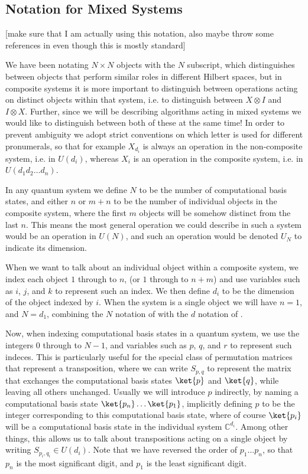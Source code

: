 \subsection{Notation for Mixed Systems}
[make sure that I am actually using this notation, also maybe throw some references in even though this is mostly standard]

We have been notating $N \times N$ objects with the $N$ subscript, which distinguishes between objects that perform similar roles in different Hilbert spaces, but in composite systems it is more important to distinguish between operations acting on distinct objects within that system, i.e. to distinguish between $X \otimes I$ and $I \otimes X$. Further, since we will be describing algorithms acting in mixed systems we would like to distinguish between both of these at the same time! In order to prevent ambiguity we adopt strict conventions on which letter is used for different pronumerals, so that for example $X_{d_i}$ is always an operation in the non-composite system, i.e. in $U(d_i)$, whereas $X_i$ is an operation in the composite system, i.e. in $U(d_1d_2\dots d_n)$.

In any quantum system we define $N$ to be the number of computational basis states, and either $n$ or $m+n$ to be the number of individual objects in the composite system, where the first $m$ objects will be somehow distinct from the last $n$. This means the most general operation we could describe in such a system would be an operation in $U(N)$, and such an operation would be denoted $U_N$ to indicate its dimension.

When we want to talk about an individual object within a composite system, we index each object $1$ through to $n$, (or $1$ through to $n+m$) and use variables such as $i$, $j$, and $k$ to represent such an index. We then define $d_i$ to be the dimension of the object indexed by $i$. When the system is a single object we will have $n = 1$, and $N = d_1$, combining the $N$ notation of \cite{tolar-clifford} with the $d$ notation of \cite{multi-valued-logic}.

Now, when indexing computational basis states in a quantum system, we use the integers $0$ through to $N-1$, and variables such as $p$, $q$, and $r$ to represent such indeces. This is particularly useful for the special class of permutation matrices that represent a transposition, where we can write $S_{p,q}$ to represent the matrix that exchanges the computational basis states $\ket{p}$ and $\ket{q}$, while leaving all others unchanged. Usually we will introduce $p$ indirectly, by naming a computational basis state $\ket{p_n}\dots\ket{p_1}$, implicitly defining $p$ to be the integer corresponding to this computational basis state, where of course $\ket{p_i}$ will be a computational basis state in the individual system $\mathbb{C}^{d_i}$. Among other things, this allows us to talk about transpositions acting on a single object by writing $S_{p_i,q_i} \in U(d_i)$. Note that we have reversed the order of $p_1 \dots p_n$, so that $p_n$ is the most significant digit, and $p_1$ is the least significant digit.

